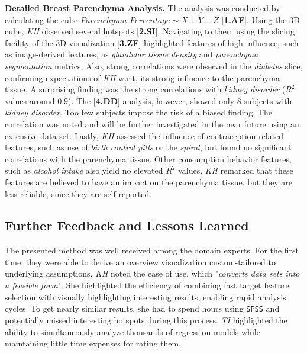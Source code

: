 \documentclass[journal]{style/vgtc} 			          %
\begin{document}
\textbf{Detailed Breast Parenchyma Analysis.}
The analysis was conducted by calculating the cube $Parenchyma\_Percentage \sim X + Y + Z$ [\textbf{1.AF}].
Using the 3D cube, \emph{KH} observed several hotspots [\textbf{2.SI}].
Navigating to them using the slicing facility of the 3D visualization [\textbf{3.ZF}] highlighted features of high influence, such as image-derived features, as \emph{glandular tissue density} and \emph{parenchyma segmentation} metrics.
Also, strong correlations were observed in the \emph{diabetes} slice, confirming expectations of \emph{KH} w.r.t. its strong influence to the parenchyma tissue.
A surprising finding was the strong correlations with \emph{kidney disorder} ($R^2$ values around $0.9$).
The [\textbf{4.DD}] analysis, however, showed only 8 subjects with \emph{kidney disorder}.
Too few subjects impose the risk of a biased finding.
The correlation was noted and will be further investigated in the near future using an extensive data set.
Lastly, \emph{KH} assessed the influence of contraception-related features, such as use of \emph{birth control pills} or the \emph{spiral}, but found no significant correlations with the parenchyma tissue.
Other consumption behavior features, such as \emph{alcohol intake} also yield no elevated $R^2$ values.
\emph{KH} remarked that these features are believed to have an impact on the parenchyma tissue, but they are less reliable, since they are self-reported.
\subsection{Further Feedback and Lessons Learned} \label{Lessons Learned}
The presented method was well received among the domain experts.
For the first time, they were able to derive an overview visualization custom-tailored to underlying assumptions.
\emph{KH} noted the ease of use, which "\emph{converts data sets into a feasible form}".
She highlighted the efficiency of combining fast target feature selection with visually highlighting interesting results, enabling rapid analysis cycles.
To get nearly similar results, she had to spend hours using \texttt{SPSS} and potentially missed interesting hotspots during this process.
\emph{TI} highlighted the ability to simultaneously analyze thousands of regression models while maintaining little time expenses for rating them.
\end{document}
